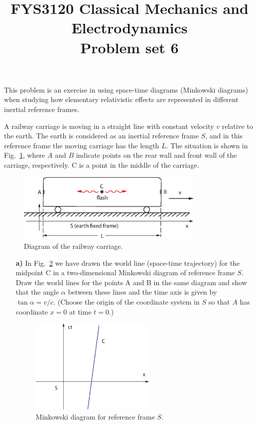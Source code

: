 \documentclass[11pt,a4paper]{report}
\title{FYS3120 Classical Mechanics and Electrodynamics\\ 
\vspace{15mm}Problem set 6}
\newcounter{excount}[chapter]
\newenvironment{exercise}[1][]{\addtocounter{excount}{1} \noindent {\bf Problem
    \arabic{excount} \ \ #1}\hspace{2mm}}{\vspace{4mm}}
\begin{document}
\maketitle


\begin{exercise}
This problem is an exercise in using space-time diagrams (Minkowski diagrams) when studying how elementary relativistic effects are represented in different inertial reference frames. 

A railway carriage is moving in a straight line with constant velocity $v$ relative to the earth. The earth is considered as an inertial reference frame $S$, and in this reference frame the moving carriage has the length $L$. The situation is shown in Fig.~\ref{fig:tog}, where
$A$ and $B$ indicate points on the rear wall and front wall of the carriage, respectively. C is a point in the middle of the carriage.

\begin{figure}[h]
\begin{center}
\includegraphics[width=9cm]{Tog.eps}
\end{center}
\caption{Diagram of the railway carriage.}
\label{fig:tog}
\end{figure}

\begin{itemize}
\item[\bf a)] In Fig.~\ref{fig:minkowski} we have drawn the world line (space-time trajectory) for the midpoint C in a two-dimensional Minkowski diagram of reference frame $S$. Draw the world lines for the points A and B in the same diagram and show that the angle $\alpha$ between these lines and the time axis is given by $\tan\alpha=v/c$. (Choose the origin of the coordinate system in $S$ so that $A$ has coordinate $x=0$ at time $t=0$.)

\begin{figure}[h]
\begin{center}
\includegraphics[width=6cm]{C-trajectory.eps}
\end{center}
\caption{Minkowski diagram for reference frame $S$.}
\label{fig:minkowski}
\end{figure}


\end{itemize}
\end{exercise}
\end{document}
